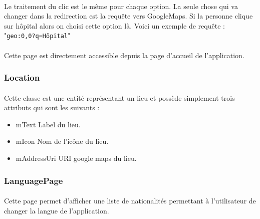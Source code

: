 	\paragraph{}
		Le traitement du clic est le même pour chaque option. La seule chose qui va changer dans la redirection est la requête vers GoogleMaps. Si la personne clique sur hôpital alors on choisi cette option là. Voici un exemple de requête : "\texttt{geo:0,0?q=Hôpital}"
	
	\paragraph{}
		Cette page est directement accessible depuis la page d'accueil de l'application.
	\subsubsection{Location}
		\paragraph{}
			Cette classe est une entité représentant un lieu et possède simplement trois attributs qui sont les suivants :
			\begin{itemize}
				\item mText Label du lieu.
				\item mIcon Nom de l'icône du lieu.
				\item mAddressUri URI google maps du lieu.
			\end{itemize}
	\subsubsection{LanguagePage}
	\paragraph{}
		Cette page permet d'afficher une liste de nationalités permettant à l'utilisateur de changer la langue de l'application.
	

